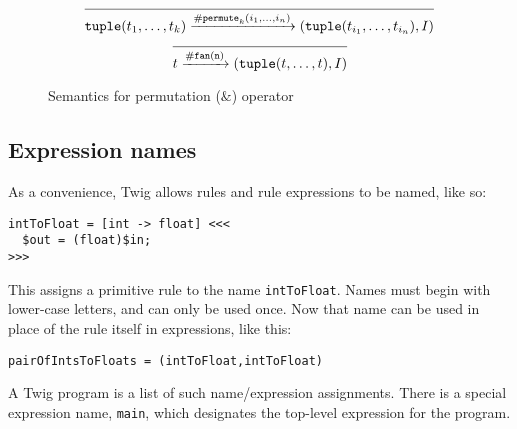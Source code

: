 \begin{figure}[ht]
\label{fig:permute}
\[
\infer
  {\mathtt{tuple}(t_1,\ldots,t_k) \arr{\#\mathtt{permute}_k(i_1,\ldots,i_n)} (\mathtt{tuple}(t_{i_1},\ldots,t_{i_n}),I)}
  {}
\]
\[
\infer
  {t \arr{\mathtt{\#fan(n)}} (\mathtt{tuple}(t,\ldots,t),I)}
  {}
\]

\caption{Semantics for permutation ($\&$) operator}
\end{figure}


\subsection{Expression names}
\label{section:names}

As a convenience, Twig allows rules and rule expressions to be named, like so:

\begin{verbatim}
intToFloat = [int -> float] <<<
  $out = (float)$in;
>>>
\end{verbatim}

This assigns a primitive rule to the name \texttt{intToFloat}. Names must begin with lower-case letters, and can only be used once. Now that name can be used in place of the rule itself in expressions, like this:

\begin{verbatim}
pairOfIntsToFloats = (intToFloat,intToFloat)
\end{verbatim}

A Twig program is a list of such name/expression assignments. There is a special expression name, \texttt{main}, which designates the top-level expression for the program.

% 
% 
